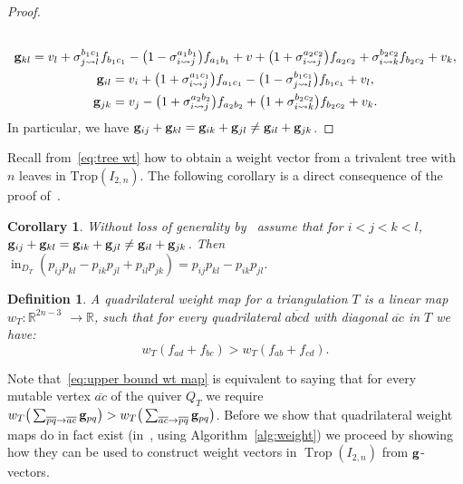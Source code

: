 \documentclass[pdftex]{sigma}%
\newtheorem{Corollary}[Theorem]{Corollary}
\newtheorem{Definition}[Theorem]{Definition}
\numberwithin{equation}{section}
\DeclareMathOperator{\init}{in}
\DeclareMathOperator{\trop}{Trop}
\begin{document}
\begin{proof}
\begin{gather*}
\\
{\bf g}_{kl} = v_l + \sigma_{j\rightsquigarrow l}^{b_1c_1}f_{b_1c_1} - \big(1 - \sigma_{i\rightsquigarrow j}^{a_1b_1}\big)f_{a_1b_1} + v + \big(1+\sigma_{i\rightsquigarrow j}^{a_2c_2}\big)f_{a_2c_2} + \sigma_{i\rightsquigarrow k}^{b_2c_2}f_{b_2c_2} + v_k,
\\
{\bf g}_{il} = v_i + \big(1+\sigma_{i\rightsquigarrow j}^{a_1c_1}\big)f_{a_1c_1} - \big(1-\sigma_{j\rightsquigarrow l}^{b_1c_1}\big)f_{b_1c_1} + v_l,
\\
{\bf g}_{jk} = v_j - \big(1+\sigma_{i\rightsquigarrow j}^{a_2b_2}
\big)f_{a_2b_2} + \big(1 +\sigma_{i\rightsquigarrow k}^{b_2c_2}\big)f_{b_2c_2} + v_k.
\end{gather*}
In particular, we have ${\bf g}_{ij}+{\bf g}_{kl}={\bf g}_{ik}+{\bf g}_{jl}\not = {\bf g}_{il}+{\bf g}_{jk}$.
\end{proof}

Recall from~\eqref{eq:tree wt} how to obtain a weight vector from a trivalent tree with $n$ leaves in $\text{Trop}(I_{2,n})$.
The following corollary is a direct consequence of the proof of~.
\begin{Corollary}
Without loss of generality by~ assume that for $i<j<k<l$, ${\bf g}_{ij}+{\bf g}_{kl}={\bf g}_{ik}+{\bf g}_{jl}\not = {\bf g}_{il}+{\bf g}_{jk}$.
Then %
$\init_{D_{T}}(p_{ij}p_{kl}-p_{ik}p_{jl}+p_{il}p_{jk})=p_{ij}p_{kl}-p_{ik}p_{jl}$.
\end{Corollary}

\begin{Definition}
A {\it quadrilateral weight map} for a triangulation $T$ is a linear map $w_T: \mathbb R^{2n-3}$ $\to \mathbb R$, such that for every quadrilateral $\overline{abcd}$ with diagonal $\overline{ac}$ in $T$ we have:
\begin{equation}\label{eq:upper bound wt map}
w_T(f_{ad}+f_{bc})>w_T(f_{ab}+f_{cd}).
\end{equation}
\end{Definition}
Note that~\eqref{eq:upper bound wt map} is equivalent to saying that for every mutable vertex $\overline{ac}$ of the quiver $Q_T$ we require
$w_T\big(\sum_{\overline{pq}\to \overline{ac}} {\bf g}_{pq}\big)>w_T\big(\sum_{\overline{ac}\to \overline{pq}}{\bf g}_{pq}\big)$.
Before we show that quadrilateral weight maps do in fact exist (in~, using Algorithm~\ref{alg:weight})
we proceed by showing how they can be used to construct weight vectors in $\trop(I_{2,n})$ from ${\bf g}$-vectors.
\end{document}
